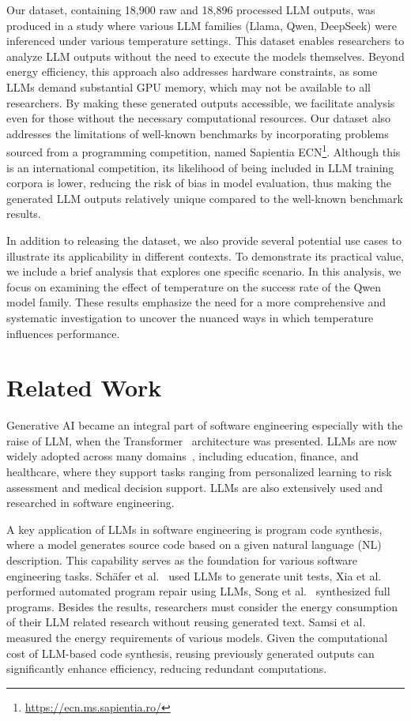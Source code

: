 Our dataset, containing 18,900 raw and 18,896 processed LLM outputs, 
was produced in a study where various LLM families (Llama, Qwen, DeepSeek) were inferenced under various temperature settings.
This dataset enables researchers to analyze LLM outputs without the need to execute the models themselves.
Beyond energy efficiency, this approach also addresses hardware constraints, as some LLMs demand substantial GPU memory, which may not be available to all researchers.
By making these generated outputs accessible, we facilitate analysis even for those without the necessary computational resources.
Our dataset also addresses the limitations of well-known benchmarks by incorporating problems sourced from a programming competition, named Sapientia ECN\footnote{\url{https://ecn.ms.sapientia.ro/}}.
Although this is an international competition, its likelihood of being included in LLM training corpora is lower, reducing the risk of bias in model evaluation, thus making the generated LLM outputs relatively unique compared to the well-known benchmark results.

In addition to releasing the dataset, we also provide several potential use cases to illustrate its applicability in different contexts.
To demonstrate its practical value, we include a brief analysis that explores one specific scenario.
In this analysis, we focus on examining the effect of temperature on the success rate of the Qwen model family.
These results emphasize the need for a more comprehensive and systematic investigation to uncover the nuanced ways in which temperature influences performance.


\section{Related Work}
\label{th4:sec:related}

Generative AI became an integral part of software engineering especially with the raise of LLM, when the Transformer~\cite{attention} architecture was presented.
	LLMs are now widely adopted across many domains~\cite{llm_story}, including education, finance, and healthcare, where they support tasks ranging from personalized learning to risk assessment and medical decision support.
	LLMs are also extensively used and researched in software engineering.

A key application of LLMs in software engineering is program code synthesis, where a model generates source code based on a given natural language (NL) description.
This capability serves as the foundation for various software engineering tasks.
Schäfer et al.~\cite{unittest_llm} used LLMs to generate unit tests, Xia et al.~\cite{shared_common_data} performed automated program repair using LLMs, Song et al.~\cite{generation_llm} synthesized full programs.
Besides the results, researchers must consider the energy consumption of their LLM related research without reusing generated text.
	Samsi et al.~\cite{from_words_to_watts} measured the energy requirements of various models.
Given the computational cost of LLM-based code synthesis, reusing previously generated outputs can significantly enhance efficiency, reducing redundant computations.

